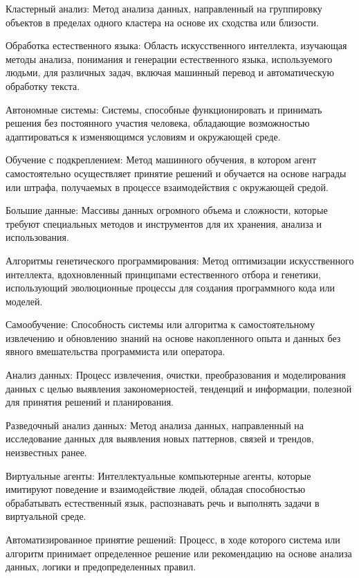     Кластерный анализ: Метод анализа данных, направленный на группировку объектов в пределах одного кластера на основе их сходства или близости.
    
    Обработка естественного языка: Область искусственного интеллекта, изучающая методы анализа, понимания и генерации естественного языка, используемого людьми, для различных задач, включая машинный перевод и автоматическую обработку текста.
    
    Автономные системы: Системы, способные функционировать и принимать решения без постоянного участия человека, обладающие возможностью адаптироваться к изменяющимся условиям и окружающей среде.
    
    Обучение с подкреплением: Метод машинного обучения, в котором агент самостоятельно осуществляет принятие решений и обучается на основе награды или штрафа, получаемых в процессе взаимодействия с окружающей средой.
    
    Большие данные: Массивы данных огромного объема и сложности, которые требуют специальных методов и инструментов для их хранения, анализа и использования.
    
    Алгоритмы генетического программирования: Метод оптимизации искусственного интеллекта, вдохновленный принципами естественного отбора и генетики, использующий эволюционные процессы для создания программного кода или моделей.
    
    Самообучение: Способность системы или алгоритма к самостоятельному извлечению и обновлению знаний на основе накопленного опыта и данных без явного вмешательства программиста или оператора.
    
    Анализ данных: Процесс извлечения, очистки, преобразования и моделирования данных с целью выявления закономерностей, тенденций и информации, полезной для принятия решений и планирования.
    
    Разведочный анализ данных: Метод анализа данных, направленный на исследование данных для выявления новых паттернов, связей и трендов, неизвестных ранее.
    
    Виртуальные агенты: Интеллектуальные компьютерные агенты, которые имитируют поведение и взаимодействие людей, обладая способностью обрабатывать естественный язык, распознавать речь и выполнять задачи в виртуальной среде.
    
    Автоматизированное принятие решений: Процесс, в ходе которого система или алгоритм принимает определенное решение или рекомендацию на основе анализа данных, логики и предопределенных правил.
    
